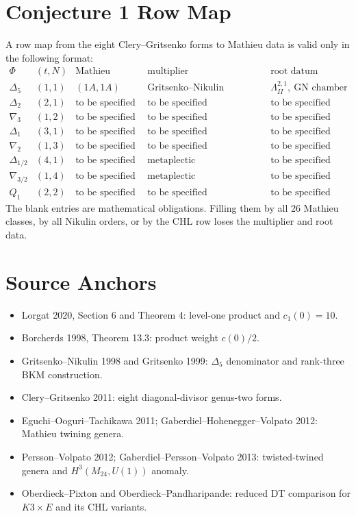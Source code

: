 \documentclass[11pt]{article}
\providecommand{\Delf}{\Delta_5}
\begin{document}
\section{Conjecture 1 Row Map}

A row map from the eight Clery--Gritsenko forms to Mathieu data is
valid only in the following format:
\[
\begin{array}{c|c|c|c|c}
\Phi & (t,N) & \text{Mathieu datum} & \text{multiplier} &
\text{root datum}\\
\hline
\Delf & (1,1) & (1A,1A) & \text{Gritsenko--Nikulin character} &
\Lambda^{2,1}_{II},\ \text{GN chamber}\\
\Delta_2 & (2,1) & \text{to be specified} & \text{to be specified} &
\text{to be specified}\\
\nabla_3 & (1,2) & \text{to be specified} & \text{to be specified} &
\text{to be specified}\\
\Delta_1 & (3,1) & \text{to be specified} & \text{to be specified} &
\text{to be specified}\\
\nabla_2 & (1,3) & \text{to be specified} & \text{to be specified} &
\text{to be specified}\\
\Delta_{1/2} & (4,1) & \text{to be specified} & \text{metaplectic} &
\text{to be specified}\\
\nabla_{3/2} & (1,4) & \text{to be specified} & \text{metaplectic} &
\text{to be specified}\\
Q_1 & (2,2) & \text{to be specified} & \text{to be specified} &
\text{to be specified}
\end{array}
\]
The blank entries are mathematical obligations.  Filling them by all 26
Mathieu classes, by all Nikulin orders, or by the CHL row loses the
multiplier and root data.

\section{Source Anchors}

\begin{itemize}
\item Lorgat 2020, Section 6 and Theorem 4: level-one product and
\(c_1(0)=10\).
\item Borcherds 1998, Theorem 13.3: product weight \(c(0)/2\).
\item Gritsenko--Nikulin 1998 and Gritsenko 1999: \(\Delf\) denominator
and rank-three BKM construction.
\item Clery--Gritsenko 2011: eight diagonal-divisor genus-two forms.
\item Eguchi--Ooguri--Tachikawa 2011; Gaberdiel--Hohenegger--Volpato
2012: Mathieu twining genera.
\item Persson--Volpato 2012; Gaberdiel--Persson--Volpato 2013:
twisted-twined genera and \(H^3(M_{24},U(1))\) anomaly.
\item Oberdieck--Pixton and Oberdieck--Pandharipande: reduced DT
comparison for \(K3\times E\) and its CHL variants.
\end{itemize}
\end{document}
